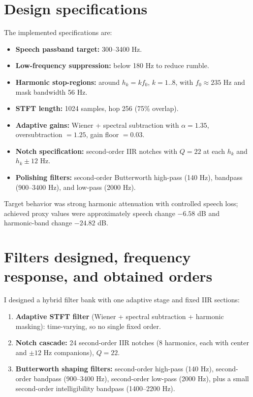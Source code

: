 \documentclass[11pt]{article}
\begin{document}
\section{Design specifications}

The implemented specifications are:
\begin{itemize}
    \item \textbf{Speech passband target:} 300--3400 Hz.
    \item \textbf{Low-frequency suppression:} below 180 Hz to reduce rumble.
    \item \textbf{Harmonic stop-regions:} around $h_k=kf_0$, $k=1..8$, with $f_0\approx235$ Hz and mask bandwidth 56 Hz.
    \item \textbf{STFT length:} 1024 samples, hop 256 (75\% overlap).
    \item \textbf{Adaptive gains:} Wiener + spectral subtraction with $\alpha=1.35$, oversubtraction $=1.25$, gain floor $=0.03$.
    \item \textbf{Notch specification:} second-order IIR notches with $Q=22$ at each $h_k$ and $h_k\pm12$ Hz.
    \item \textbf{Polishing filters:} second-order Butterworth high-pass (140 Hz), bandpass (900--3400 Hz), and low-pass (2000 Hz).
\end{itemize}

Target behavior was strong harmonic attenuation with controlled speech loss; achieved proxy values were approximately speech change $-6.58$ dB and harmonic-band change $-24.82$ dB.

\section{Filters designed, frequency response, and obtained orders}

I designed a hybrid filter bank with one adaptive stage and fixed IIR sections:
\begin{enumerate}
    \item \textbf{Adaptive STFT filter} (Wiener + spectral subtraction + harmonic masking): time-varying, so no single fixed order.
    \item \textbf{Notch cascade:} 24 second-order IIR notches (8 harmonics, each with center and $\pm12$ Hz companions), $Q=22$.
    \item \textbf{Butterworth shaping filters:} second-order high-pass (140 Hz), second-order bandpass (900--3400 Hz), second-order low-pass (2000 Hz), plus a small second-order intelligibility bandpass (1400--2200 Hz).
\end{enumerate}
\end{document}
